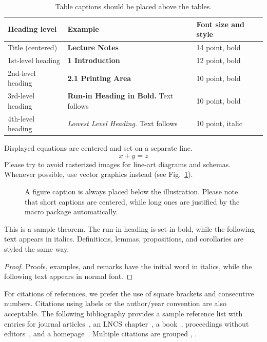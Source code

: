 \documentclass[runningheads]{llncs}
\begin{document}
\begin{table}
\caption{Table captions should be placed above the
tables.}\label{tab1}
\begin{tabular}{|l|l|l|}
\hline
Heading level &  Example & Font size and style\\
\hline
Title (centered) &  {\Large\bfseries Lecture Notes} & 14 point, bold\\
1st-level heading &  {\large\bfseries 1 Introduction} & 12 point, bold\\
2nd-level heading & {\bfseries 2.1 Printing Area} & 10 point, bold\\
3rd-level heading & {\bfseries Run-in Heading in Bold.} Text follows & 10 point, bold\\
4th-level heading & {\itshape Lowest Level Heading.} Text follows & 10 point, italic\\
\hline
\end{tabular}
\end{table}


\noindent Displayed equations are centered and set on a separate
line.
\begin{equation}
x + y = z
\end{equation}
Please try to avoid rasterized images for line-art diagrams and
schemas. Whenever possible, use vector graphics instead (see
Fig.~\ref{fig1}).

\begin{figure}
\caption{A figure caption is always placed below the illustration.
Please note that short captions are centered, while long ones are
justified by the macro package automatically.} \label{fig1}
\end{figure}

\begin{theorem}
This is a sample theorem. The run-in heading is set in bold, while
the following text appears in italics. Definitions, lemmas,
propositions, and corollaries are styled the same way.
\end{theorem}
%
%
\begin{proof}
Proofs, examples, and remarks have the initial word in italics,
while the following text appears in normal font.
\end{proof}
For citations of references, we prefer the use of square brackets
and consecutive numbers. Citations using labels or the author/year
convention are also acceptable. The following bibliography provides
a sample reference list with entries for journal
articles~\cite{ref_article1}, an LNCS chapter~\cite{ref_lncs1}, a
book~\cite{ref_book1}, proceedings without editors~\cite{ref_proc1},
and a homepage~\cite{ref_url1}. Multiple citations are grouped
\cite{ref_article1,ref_lncs1,ref_book1},
\cite{ref_article1,ref_book1,ref_proc1,ref_url1}.
\end{document}

